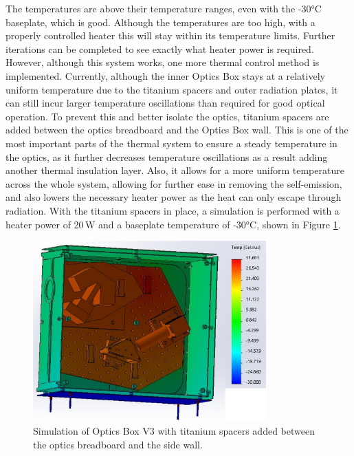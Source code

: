 The temperatures are above their temperature ranges, even with the -30°C baseplate, which is good. Although the temperatures are too high, with a properly controlled heater this will stay within its temperature limits. Further iterations can be completed to see exactly what heater power is required. However, although this system works, one more thermal control method is implemented. Currently, although the inner Optics Box stays at a relatively uniform temperature due to the titanium spacers and outer radiation plates, it can still incur larger temperature oscillations than required for good optical operation. To prevent this and better isolate the optics, titanium spacers are added between the optics breadboard and the Optics Box wall. This is one of the most important parts of the thermal system to ensure a steady temperature in the optics, as it further decreases temperature oscillations as a result adding another thermal insulation layer. Also, it allows for a more uniform temperature across the whole system, allowing for further ease in removing the self-emission, and also lowers the necessary heater power as the heat can only escape through radiation. With the titanium spacers in place, a simulation is performed with a heater power of 20\,W and a baseplate temperature of -30°C, shown in Figure \ref{fig:OB_V3_TA_3_SPACERS_ADDED}.

\begin{figure}
    \centering
    \includegraphics[width=0.8\textwidth]{chap3_images/LIFE_V3_images/TA_-30_deg_20W_heater_isolated_board_FIXED.png}
    \caption{Simulation of Optics Box V3 with titanium spacers added between the optics breadboard and the side wall.}
    \label{fig:OB_V3_TA_3_SPACERS_ADDED}
\end{figure}


